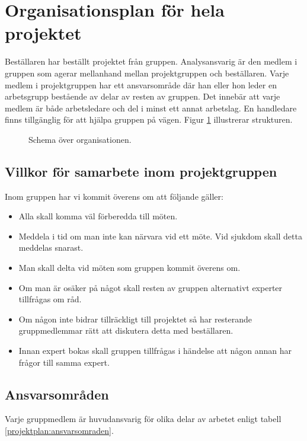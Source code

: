 \section{Organisationsplan för hela projektet}
Beställaren har beställt projektet från gruppen. Analysansvarig är den medlem i gruppen som agerar mellanhand mellan projektgruppen och beställaren. Varje medlem i projektgruppen har ett ansvarsområde där han eller hon leder en arbetsgrupp bestående av delar av resten av gruppen. Det innebär att varje medlem är både arbetsledare och del i minst ett annat arbetslag. En handledare finns tillgänglig för att hjälpa gruppen på vägen. Figur \ref{projektplan:organisationsplan} illustrerar strukturen.

\begin{figure}[h!]
\center
{}%

%
\caption{Schema över organisationen.} \label{projektplan:organisationsplan}
\endcenter
\end{figure}

\subsection{Villkor för samarbete inom projektgruppen}
Inom gruppen har vi kommit överens om att följande gäller:
\begin{itemize}
\item{Alla skall komma väl förberedda till möten.}
\item{Meddela i tid om man inte kan närvara vid ett möte. Vid sjukdom skall detta meddelas snarast.}
\item{Man skall delta vid möten som gruppen kommit överens om.}
\item{Om man är osäker på något skall resten av gruppen alternativt experter tillfrågas om råd.}
\item{Om någon inte bidrar tillräckligt till projektet så har resterande gruppmedlemmar rätt att diskutera detta med beställaren.}
\item{Innan expert bokas skall gruppen tillfrågas i händelse att någon annan har frågor till samma expert.}
\end{itemize}

\newpage
\subsection{Ansvarsområden}
Varje gruppmedlem är huvudansvarig för olika delar av arbetet enligt tabell \ref{projektplan:ansvarsomraden}.

